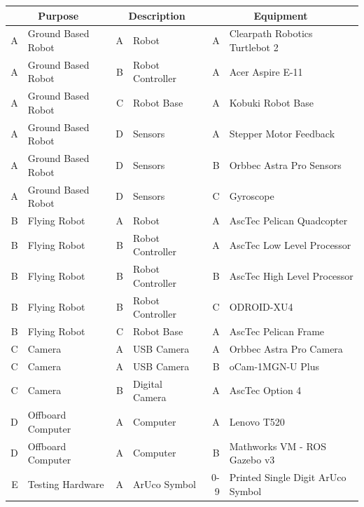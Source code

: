 \documentclass{article}[12]
\begin{document}
	\begin{table}
		\small
		\begin{tabular}{|rl|rl|rl|}
			\hline
			\multicolumn{2}{|c|}{\textbf{Purpose}} & \multicolumn{2}{c|}{\textbf{Description}} & \multicolumn{2}{c|}{\textbf{Equipment}} \\ \hline
			A & Ground Based Robot     & A & Robot              & A   & Clearpath Robotics Turtlebot 2    \\
			A & Ground Based Robot     & B & Robot Controller   & A   & Acer Aspire E-11                  \\
			A & Ground Based Robot     & C & Robot Base         & A   & Kobuki Robot Base                 \\
			A & Ground Based Robot     & D & Sensors            & A   & Stepper Motor Feedback            \\
			A & Ground Based Robot     & D & Sensors            & B   & Orbbec Astra Pro Sensors          \\
			A & Ground Based Robot     & D & Sensors            & C   & Gyroscope                         \\ \hline
			B & Flying Robot           & A & Robot              & A   & AscTec Pelican Quadcopter         \\
			B & Flying Robot           & B & Robot Controller   & A   & AscTec Low Level Processor        \\
			B & Flying Robot           & B & Robot Controller   & B   & AscTec High Level Processor       \\
			B & Flying Robot           & B & Robot Controller   & C   & ODROID-XU4                        \\
			B & Flying Robot           & C & Robot Base         & A   & AscTec Pelican Frame              \\ \hline
			C & Camera                 & A & USB Camera         & A   & Orbbec Astra Pro Camera           \\
			C & Camera                 & A & USB Camera         & B   & oCam-1MGN-U Plus                  \\
			C & Camera                 & B & Digital Camera     & A   & AscTec Option 4                   \\ \hline
			D & Offboard Computer      & A & Computer           & A   & Lenovo T520                       \\
			D & Offboard Computer      & A & Computer           & B   & Mathworks VM - ROS Gazebo v3      \\ \hline
			E & Testing Hardware       & A & ArUco Symbol       & 0-9 & Printed Single Digit ArUco Symbol \\

\end{tabular}
\end{table}
\end{document}
